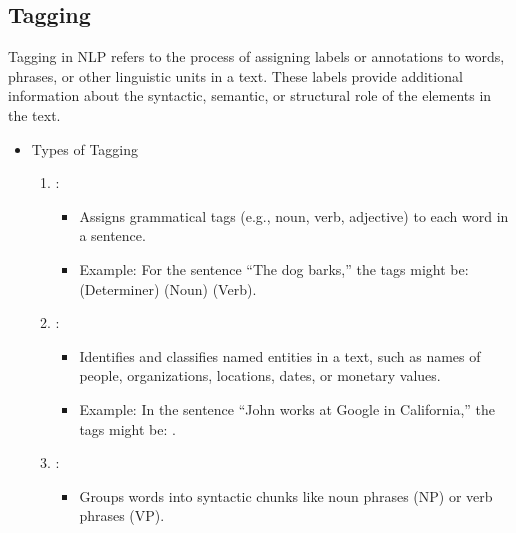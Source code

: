 \documentclass[letterpaper,11pt,english]{sphinxmanual}
\begin{document}
\subsection{Tagging}
\label{\detokenize{prelim:tagging}}
\sphinxAtStartPar
Tagging in NLP refers to the process of assigning labels or annotations
to words, phrases, or other linguistic units in a text. These labels provide additional information about
the syntactic, semantic, or structural role of the elements in the text.
\begin{itemize}
\item {} 
\sphinxAtStartPar
Types of Tagging
\begin{enumerate}
%
\item {} 
\sphinxAtStartPar
{}:
\begin{itemize}
\item {} 
\sphinxAtStartPar
Assigns grammatical tags (e.g., noun, verb, adjective) to each word in a sentence.

\item {} 
\sphinxAtStartPar
Example: For the sentence “The dog barks,” the tags might be:
\sphinxhyphen{}  (Determiner)
\sphinxhyphen{}  (Noun)
\sphinxhyphen{}  (Verb).

\end{itemize}

\item {} 
\sphinxAtStartPar
{}:
\begin{itemize}
\item {} 
\sphinxAtStartPar
Identifies and classifies named entities in a text, such as names of people, organizations, locations, dates, or monetary values.

\item {} 
\sphinxAtStartPar
Example: In the sentence “John works at Google in California,” the tags might be:
\sphinxhyphen{} 
\sphinxhyphen{} 
\sphinxhyphen{} .

\end{itemize}

\item {} 
\sphinxAtStartPar
{}:
\begin{itemize}
\item {} 
\sphinxAtStartPar
Groups words into syntactic chunks like noun phrases (NP) or verb phrases (VP).


\end{itemize}
\end{enumerate}
\end{itemize}
\end{document}
